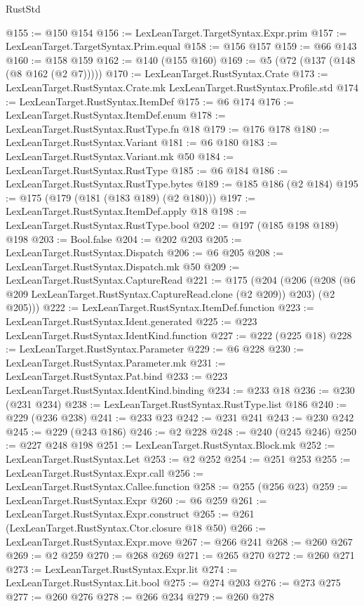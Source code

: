 \begin{lexlean}{RustStd}
\begin{coremodule}
@155 := @150 @154
@156 := LexLeanTarget.TargetSyntax.Expr.prim
@157 := LexLeanTarget.TargetSyntax.Prim.equal
@158 := @156 @157
@159 := @66 @143
@160 := @158 @159
@162 := @140 (@155 @160)
@169 := @5 (@72 (@137 (@148 (@8 @162 (@2 @7)))))
@170 := LexLeanTarget.RustSyntax.Crate
@173 := LexLeanTarget.RustSyntax.Crate.mk LexLeanTarget.RustSyntax.Profile.std
@174 := LexLeanTarget.RustSyntax.ItemDef
@175 := @6 @174
@176 := LexLeanTarget.RustSyntax.ItemDef.enum
@178 := LexLeanTarget.RustSyntax.RustType.fn @18
@179 := @176 @178
@180 := LexLeanTarget.RustSyntax.Variant
@181 := @6 @180
@183 := LexLeanTarget.RustSyntax.Variant.mk @50
@184 := LexLeanTarget.RustSyntax.RustType
@185 := @6 @184
@186 := LexLeanTarget.RustSyntax.RustType.bytes
@189 := @185 @186 (@2 @184)
@195 := @175 (@179 (@181 (@183 @189) (@2 @180)))
@197 := LexLeanTarget.RustSyntax.ItemDef.apply @18
@198 := LexLeanTarget.RustSyntax.RustType.bool
@202 := @197 (@185 @198 @189) @198
@203 := Bool.false
@204 := @202 @203
@205 := LexLeanTarget.RustSyntax.Dispatch
@206 := @6 @205
@208 := LexLeanTarget.RustSyntax.Dispatch.mk @50
@209 := LexLeanTarget.RustSyntax.CaptureRead
@221 := @175
    (@204
      (@206 (@208 (@6 @209 LexLeanTarget.RustSyntax.CaptureRead.clone (@2 @209)) @203) (@2 @205)))
@222 := LexLeanTarget.RustSyntax.ItemDef.function
@223 := LexLeanTarget.RustSyntax.Ident.generated
@225 := @223 LexLeanTarget.RustSyntax.IdentKind.function
@227 := @222 (@225 @18)
@228 := LexLeanTarget.RustSyntax.Parameter
@229 := @6 @228
@230 := LexLeanTarget.RustSyntax.Parameter.mk
@231 := LexLeanTarget.RustSyntax.Pat.bind
@233 := @223 LexLeanTarget.RustSyntax.IdentKind.binding
@234 := @233 @18
@236 := @230 (@231 @234)
@238 := LexLeanTarget.RustSyntax.RustType.list @186
@240 := @229 (@236 @238)
@241 := @233 @23
@242 := @231 @241
@243 := @230 @242
@245 := @229 (@243 @186)
@246 := @2 @228
@248 := @240 (@245 @246)
@250 := @227 @248 @198
@251 := LexLeanTarget.RustSyntax.Block.mk
@252 := LexLeanTarget.RustSyntax.Let
@253 := @2 @252
@254 := @251 @253
@255 := LexLeanTarget.RustSyntax.Expr.call
@256 := LexLeanTarget.RustSyntax.Callee.function
@258 := @255 (@256 @23)
@259 := LexLeanTarget.RustSyntax.Expr
@260 := @6 @259
@261 := LexLeanTarget.RustSyntax.Expr.construct
@265 := @261 (LexLeanTarget.RustSyntax.Ctor.closure @18 @50)
@266 := LexLeanTarget.RustSyntax.Expr.move
@267 := @266 @241
@268 := @260 @267
@269 := @2 @259
@270 := @268 @269
@271 := @265 @270
@272 := @260 @271
@273 := LexLeanTarget.RustSyntax.Expr.lit
@274 := LexLeanTarget.RustSyntax.Lit.bool
@275 := @274 @203
@276 := @273 @275
@277 := @260 @276
@278 := @266 @234
@279 := @260 @278

\end{coremodule}
\end{lexlean}
